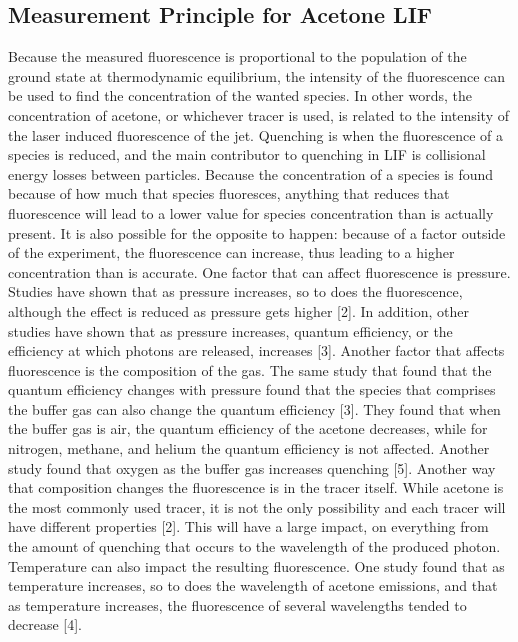 \documentclass{article}
\begin{document}
\subsection*{Measurement Principle for Acetone LIF}
Because the measured fluorescence is proportional to the population of the ground state at thermodynamic equilibrium, the intensity of the fluorescence can be used to find the concentration of the wanted species.  In other words, the concentration of acetone, or whichever tracer is used, is related to the intensity of the laser induced fluorescence of the jet. 
\newline
\indent Quenching is when the fluorescence of a species is reduced, and the main contributor to quenching in LIF is collisional energy losses between particles.  Because the concentration of a species is found because of how much that species fluoresces, anything that reduces that fluorescence will lead to a lower value for species concentration than is actually present.  It is also possible for the opposite to happen: because of a factor outside of the experiment, the fluorescence can increase, thus leading to a higher concentration than is accurate.  \newline
\indent One factor that can affect fluorescence is pressure.  Studies have shown that as pressure increases, so to does the fluorescence, although the effect is reduced as pressure gets higher [2].  In addition, other studies have shown that as pressure increases, quantum efficiency, or the efficiency at which photons are released, increases [3].\newline
\indent Another factor that affects fluorescence is the composition of the gas. The same study that found that the quantum efficiency changes with pressure found that the species that comprises the buffer gas can also change the quantum efficiency [3].  They found that when the buffer gas is air, the quantum efficiency of the acetone decreases, while for nitrogen, methane, and helium the quantum efficiency is not affected.  Another study found that oxygen as the buffer gas increases quenching [5].  Another way that composition changes the fluorescence is in the tracer itself.  While acetone is the most commonly used tracer, it is not the only possibility and each tracer will have different properties [2].  This will have a large impact, on everything from the amount of quenching that occurs to the wavelength of the produced photon. \newline
\indent Temperature can also impact the resulting fluorescence.  One study found that as temperature increases, so to does the wavelength of acetone emissions, and that as temperature increases, the fluorescence of several wavelengths tended to decrease [4].
\end{document}
